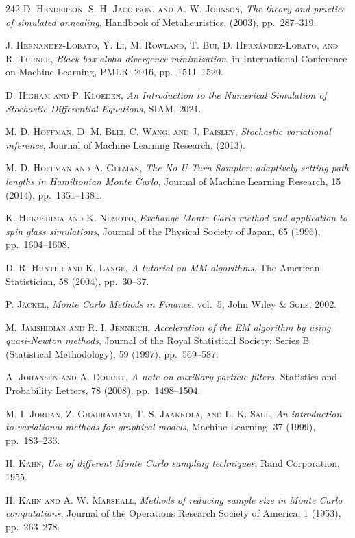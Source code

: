 \begin{thebibliography}{242}
\textsc{D. Henderson, S. H. Jacobson, and A. W. Johnson},
\textit{The theory and practice of simulated annealing},
Handbook of Metaheuristics, (2003), pp.\ 287--319.

\textsc{J. Hernandez-Lobato, Y. Li, M. Rowland, T. Bui, D. Hern\'andez-Lobato, and R. Turner},
\textit{Black-box alpha divergence minimization},
in International Conference on Machine Learning, PMLR, 2016, pp.\ 1511--1520.

\textsc{D. Higham and P. Kloeden},
\textit{An Introduction to the Numerical Simulation of Stochastic Differential Equations},
SIAM, 2021.

\textsc{M. D. Hoffman, D. M. Blei, C. Wang, and J. Paisley},
\textit{Stochastic variational inference},
Journal of Machine Learning Research, (2013).

\textsc{M. D. Hoffman and A. Gelman},
\textit{The No-U-Turn Sampler: adaptively setting path lengths in Hamiltonian Monte Carlo},
Journal of Machine Learning Research, 15 (2014), pp.\ 1351--1381.

\textsc{K. Hukushima and K. Nemoto},
\textit{Exchange Monte Carlo method and application to spin glass simulations},
Journal of the Physical Society of Japan, 65 (1996), pp.\ 1604--1608.

\textsc{D. R. Hunter and K. Lange},
\textit{A tutorial on MM algorithms},
The American Statistician, 58 (2004), pp.\ 30--37.

\textsc{P. J\"ackel},
\textit{Monte Carlo Methods in Finance},
vol.\ 5, John Wiley \& Sons, 2002.

\textsc{M. Jamshidian and R. I. Jennrich},
\textit{Acceleration of the EM algorithm by using quasi-Newton methods},
Journal of the Royal Statistical Society: Series B (Statistical Methodology), 59 (1997), pp.\ 569--587.

\textsc{A. Johansen and A. Doucet},
\textit{A note on auxiliary particle filters},
Statistics and Probability Letters, 78 (2008), pp.\ 1498--1504.

\textsc{M. I. Jordan, Z. Ghahramani, T. S. Jaakkola, and L. K. Saul},
\textit{An introduction to variational methods for graphical models},
Machine Learning, 37 (1999), pp.\ 183--233.

\textsc{H. Kahn},
\textit{Use of different Monte Carlo sampling techniques},
Rand Corporation, 1955.

\textsc{H. Kahn and A. W. Marshall},
\textit{Methods of reducing sample size in Monte Carlo computations},
Journal of the Operations Research Society of America, 1 (1953), pp.\ 263--278.


\end{thebibliography}
